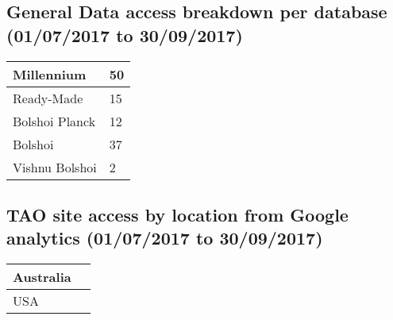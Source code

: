 \documentclass{article}%
\begin{document}
\subsection{General Data access breakdown per database (01/07/2017 to 30/09/2017)}%

%
\begin{longtabu}{X[l] X[l]}%
Millennium&50\\%
\hline%
Ready{-}Made&15\\%
\hline%
Bolshoi Planck&12\\%
\hline%
Bolshoi&37\\%
\hline%
Vishnu Bolshoi&2\\%
\hline%
\end{longtabu}%
\subsection{TAO site access by location from Google analytics (01/07/2017 to 30/09/2017)}%

%
\begin{longtabu}{X[l] X[l]}%
Australia&\\%
\hline%
USA&\\%
\hline%
\end{longtabu}%
\end{document}
